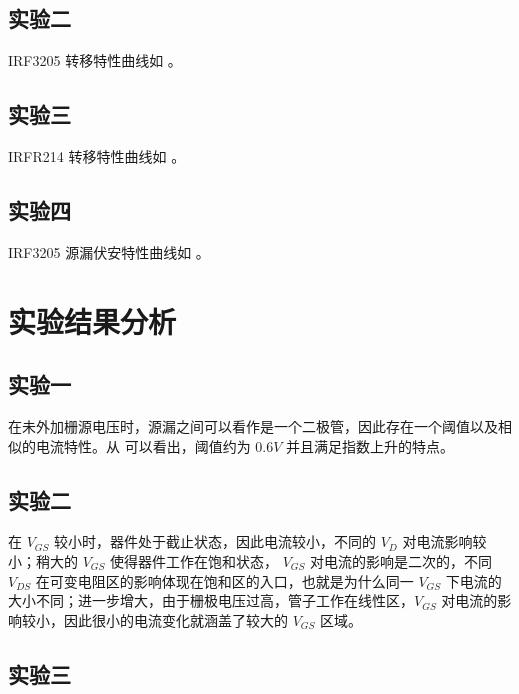 \documentclass[lang=cn,11pt,a4paper,cite=authoryear]{elegantpaper}
\begin{document}


\subsection{实验二}

IRF3205 转移特性曲线如 。




\subsection{实验三}

IRFR214 转移特性曲线如 。




\subsection{实验四}

IRF3205 源漏伏安特性曲线如 。




\section{实验结果分析}

\subsection{实验一} 

在未外加栅源电压时，源漏之间可以看作是一个二极管，因此存在一个阈值以及相似的电流特性。从  可以看出，阈值约为 \(0.6V\) 并且满足指数上升的特点。

\subsection{实验二}\label{sec1}

在 \(V_{GS}\) 较小时，器件处于截止状态，因此电流较小，不同的 \(V_D\) 对电流影响较小；稍大的 \(V_{GS}\) 使得器件工作在饱和状态， \(V_{GS}\) 对电流的影响是二次的，不同 \(V_{DS}\) 在可变电阻区的影响体现在饱和区的入口，也就是为什么同一 \(V_{GS}\) 下电流的大小不同；进一步增大，由于栅极电压过高，管子工作在线性区，\(V_{GS}\) 对电流的影响较小，因此很小的电流变化就涵盖了较大的 \(V_{GS}\) 区域。

\subsection{实验三}
\end{document}
